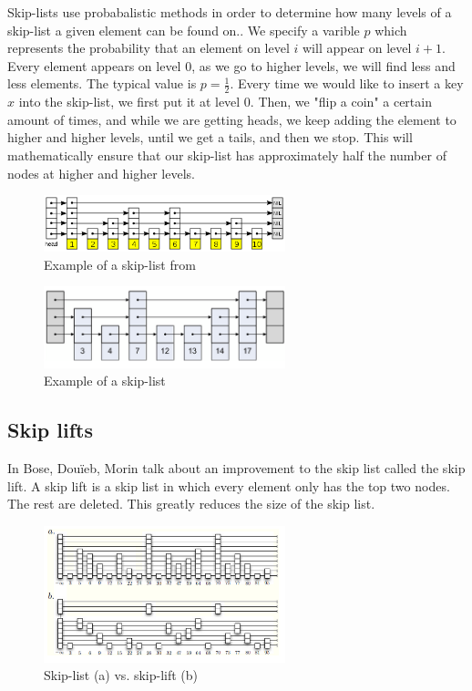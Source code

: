 \documentclass[oribibl]{llncs}
\begin{document}
Skip-lists use probabalistic methods in order to determine how many levels of a skip-list a given element can be found on.. We specify a varible $p$ which represents the probability that an element on level $i$ will appear on level $i+1$. Every element appears on level 0, as we go to higher levels, we will find less and less elements. The typical value is $p=\frac{1}{2}$. Every time we would like to insert a key $x$ into the skip-list, we first put it at level 0. Then, we "flip a coin" a certain amount of times, and while we are getting heads, we keep adding the element to higher and higher levels, until we get a tails, and then we stop. This will mathematically ensure that our skip-list has approximately half the number of nodes at higher and higher levels.



\begin{figure}[here]
\center
\includegraphics[width=7cm]{images/skip_list}
\caption{Example of a skip-list from \cite{skip_list}}
\label{fig:skip_list}
\end{figure}

\begin{figure}[here]
\center
\includegraphics[width=7cm]{images/skip_list1}
\caption{Example of a skip-list}
\label{fig:skip_list}
\end{figure}

\subsection{Skip lifts}

In \cite{skip_lift} Bose, Douïeb, Morin talk about an improvement to the skip list called the skip lift. A skip lift is a skip list in which every element only has the top two nodes. The rest are deleted. This greatly reduces the size of the skip list.

\begin{figure}[here]
\center
\includegraphics[width=7cm]{images/skiplist_vs_skiplift}
\caption{Skip-list (a)  vs. skip-lift (b)}
\label{fig:skip_list}
\end{figure}
\end{document}
